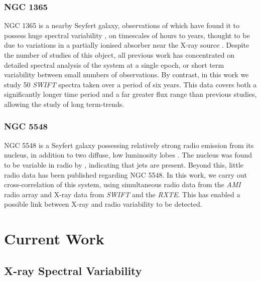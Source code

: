\documentclass[letters,useAMS,usenatbib]{samnote}
\begin{document}
\subsubsection{NGC 1365}

NGC 1365 is a nearby Seyfert galaxy, observations of which have found it to possess huge spectral variability \citep{risaliti09}, on timescales of hours to years,
thought to be due to variations in a partially ionised absorber near the X-ray source \citep{brenneman}. Despite the number of studies of this object, all previous work
has concentrated on detailed spectral analysis of the system at a single epoch, or short term variability between small numbers of observations. By contrast, in this work
we study 50 {\it SWIFT} spectra taken over a period of six years. This data covers both a significantly longer time period and a far greater flux range than previous
studies, allowing the study of long term-trends.

\subsubsection{NGC 5548}

NGC 5548 is a Seyfert galaxy possessing relatively strong radio emission from its nucleus, in addition to two diffuse, low luminosity lobes \citep{wilson82}.
The nucleus was found to be variable in radio by \citet{wroble00}, indicating that jets are present. Beyond this, little radio data has been published
regarding NGC 5548. In this work, we carry out cross-correlation of this system, using simultaneous radio data from the {\it AMI} radio array and X-ray data from {\it
SWIFT} and the {\it RXTE}. This has enabled a possible link between X-ray and radio variability to be detected.

\clearpage

\section{Current Work}


\subsection{X-ray Spectral Variability}

\end{document}

